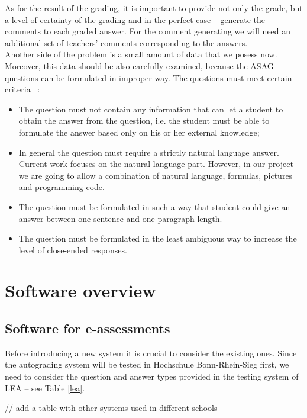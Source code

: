 \documentclass[11pt]{report}
\numberwithin{equation}{section} %
\begin{document}
As for the result of the grading, it is important to provide not only the grade, but a level of certainty of the grading and in the perfect case -- generate the comments to each graded answer. For the comment generating we will need an additional set of teachers' comments corresponding to the answers. \\

Another side of the problem is a small amount of data that we posess now. Moreover, this data should be also carefully examined, because the ASAG questions can be formulated in improper way. The questions must meet certain criteria ~\cite{Hasanah}:
\begin{itemize}
\item The question must not contain any information that can let a student to obtain the answer from the question, i.e. the student must be able to formulate the answer based only on his or her external knowledge;
\item In general the question must require a strictly natural language answer. Current work focuses on the natural language part. However, in our project we are going to allow a combination of natural language, formulas, pictures and programming code.
\item The question must be formulated in such a way that student could give an answer between one sentence and one paragraph length.
\item The question must be formulated in the least ambiguous way to increase the level of close-ended responses.
\end{itemize}


\section*{\textbf{Software overview}}
\subsection{Software for e-assessments}

Before introducing a new system it is crucial to consider the existing ones. Since the autograding system will be tested in Hochschule Bonn-Rhein-Sieg first, we need to consider the question and answer types provided in the testing system of LEA -- see Table \ref{lea}.

// add a table with other systems used in different schools
\end{document}
